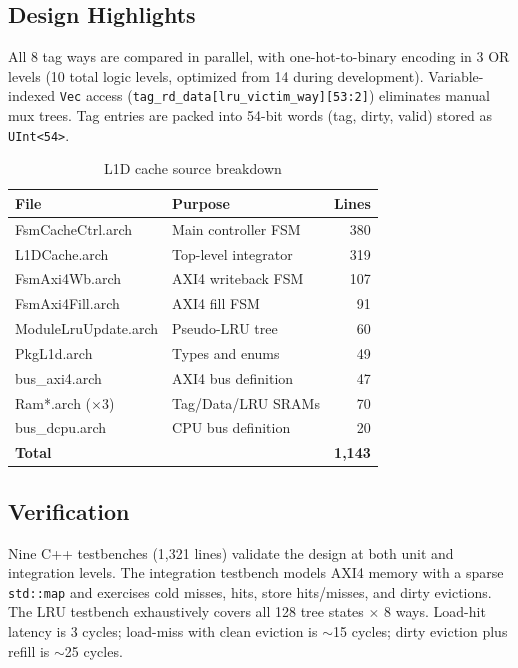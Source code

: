 \documentclass[manuscript]{acmart}
\begin{document}
\subsection{Design Highlights}

All 8 tag ways are compared in parallel, with one-hot-to-binary encoding in 3 OR levels (10 total logic levels, optimized from 14 during development). Variable-indexed \texttt{Vec} access (\texttt{tag\_rd\_data[lru\_victim\_way][53:2]}) eliminates manual mux trees. Tag entries are packed into 54-bit words (tag, dirty, valid) stored as \texttt{UInt<54>}.

\begin{table}[H]
\centering
\caption{L1D cache source breakdown}
\label{tab:l1d}
\footnotesize
\begin{tabular}{@{}llr@{}}
\toprule
\textbf{File} & \textbf{Purpose} & \textbf{Lines} \\
\midrule
FsmCacheCtrl.arch & Main controller FSM & 380 \\
L1DCache.arch & Top-level integrator & 319 \\
FsmAxi4Wb.arch & AXI4 writeback FSM & 107 \\
FsmAxi4Fill.arch & AXI4 fill FSM & 91 \\
ModuleLruUpdate.arch & Pseudo-LRU tree & 60 \\
PkgL1d.arch & Types and enums & 49 \\
bus\_axi4.arch & AXI4 bus definition & 47 \\
Ram*.arch ($\times$3) & Tag/Data/LRU SRAMs & 70 \\
bus\_dcpu.arch & CPU bus definition & 20 \\
\midrule
\textbf{Total} & & \textbf{1,143} \\
\bottomrule
\end{tabular}
\end{table}

\subsection{Verification}

Nine C++ testbenches (1,321 lines) validate the design at both unit and integration levels. The integration testbench models AXI4 memory with a sparse \texttt{std::map} and exercises cold misses, hits, store hits/misses, and dirty evictions. The LRU testbench exhaustively covers all 128 tree states $\times$ 8 ways. Load-hit latency is 3 cycles; load-miss with clean eviction is ${\sim}$15 cycles; dirty eviction plus refill is ${\sim}$25 cycles.
\end{document}

